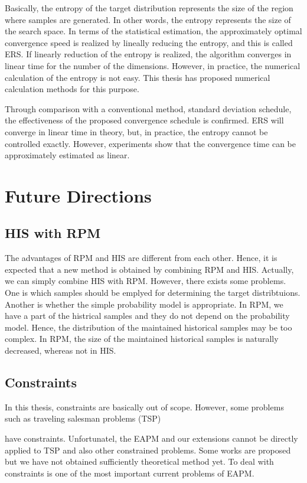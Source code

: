 Basically, the entropy of the target distribution
represents the size of the region where samples are generated.
In other words, the entropy represents the size of the search space.
In terms of the statistical estimation,
the approximately optimal convergence speed is 
realized by lineally reducing the entropy, 
and this is called ERS.
If linearly reduction of the entropy is realized,
the algorithm converges in linear time for the number of the dimensions.
However, in practice, the numerical calculation of the entropy is 
not easy. This thesis has proposed numerical calculation methods for
this purpose.

Through comparison with a conventional method, standard deviation schedule,
the effectiveness of the proposed convergence schedule is confirmed.
ERS will converge in linear time in theory,
but, in practice, the entropy cannot be controlled exactly.
However, experiments show that
the convergence time can be approximately estimated as linear.


\section{Future Directions}
\subsection{HIS with RPM}
The advantages of RPM and HIS are different from each other.
Hence, it is expected that
a new method is obtained by combining RPM and HIS.
Actually, we can simply combine HIS with RPM.
However, there exists some problems.
One is which samples should be emplyed for determining the target
distribtuions.
Another is whether the simple probability model is appropriate.
In RPM, we have a part of the histrical samples and they do not depend on
the probability model.
Hence, the distribution of the maintained historical samples 
may be too complex.
In RPM, the size of the maintained historical samples is
naturally decreased,
whereas not in HIS.


\subsection{Constraints}
In this thesis,
constraints are basically out of scope.
However, 
some problems such as traveling salesman problems (TSP)

have constraints.
Unfortunatel,
the EAPM and our extensions cannot 
be directly applied to TSP and also other constrained problems.
Some works \cite{rubinstein:ce,tsutsui:tsp} are proposed but
we have not obtained sufficiently theoretical method yet.
To deal with constraints is one of the most important current problems
of EAPM.



